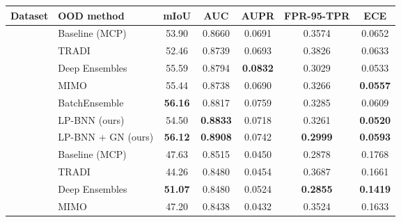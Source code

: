 \documentclass[10pt,twocolumn,letterpaper]{article}
\begin{document}
 
\begin{table*}[htbp]
\renewcommand{\figurename}{Table}
\renewcommand{\captionfont}{\small}
 \vspace{-2mm}
 \begin{center}
 \scalebox{0.65}
 {
 \begin{tabular}{c l  c c c c c }
 \toprule
 Dataset & OOD method  & mIoU  & AUC   & AUPR  & FPR-95-TPR  & ECE  \\ 
 \midrule
{}  & Baseline (MCP)~\cite{hendrycks2016baseline} & 53.90  & 0.8660& 0.0691 & 0.3574 & 0.0652 \\ 
             & TRADI      \cite{franchi2019tradi} &  52.46	& 0.8739 & 0.0693 & 0.3826 &0.0633\\
           & Deep Ensembles  \cite{lakshminarayanan2017simple}& 55.59 & 0.8794 & \textbf{0.0832} & 0.3029 & 0.0533 \\
            & MIMO  \cite{havasi2020training} & 55.44 &  0.8738 &  0.0690 & 0.3266 & \textbf{0.0557} \\ 
                  & BatchEnsemble \cite{wen2020batchensemble}  &\textbf{56.16}  & 0.8817 & 0.0759 & 0.3285 & 0.0609 \\ 
                                 & LP-BNN (ours)  &  54.50 & \textbf{0.8833} & 0.0718 & 0.3261 & \textbf{0.0520}  \\
           & LP-BNN + GN (ours)  & \textbf{56.12} & \textbf{0.8908} & 0.0742 &\textbf{0.2999} & \textbf{0.0593}  \\
\midrule 
                                 & Baseline (MCP)~\cite{hendrycks2016baseline} &  47.63  & 0.8515  & 0.0450  & 0.2878  & 0.1768 \\ 

    & TRADI   \cite{franchi2019tradi}   & 44.26	& 0.8480	& 0.0454	& 0.3687	& 0.1661 \\ 
 & Deep Ensembles  \cite{lakshminarayanan2017simple}& \textbf{51.07}  & 0.8480  & 0.0524  & \textbf{0.2855 } &\textbf{0.1419 } \\
  & MIMO  \cite{havasi2020training}& 47.20  &  0.8438  & 0.0432  & 0.3524 &0.1633  \\


\end{tabular}}
\end{center}
\end{table*}
\end{document}
